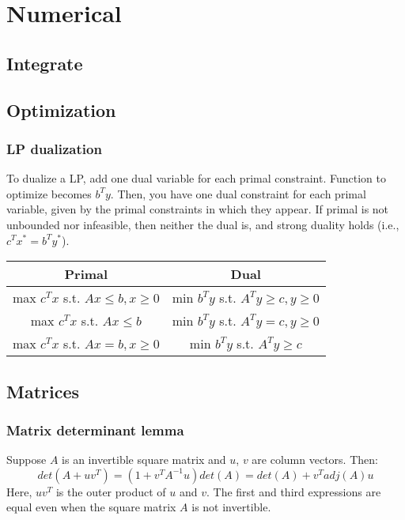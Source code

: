 \chapter{Numerical}

\section{Integrate}
  
\section{Optimization}
	
	\subsection{LP dualization}
	To dualize a LP, add one dual variable for each primal 
	constraint. Function to optimize becomes $b^T y$. 
	Then, you have one dual constraint for each primal variable, 
	given by the primal constraints in which they appear. 
	If primal is not unbounded nor infeasible, then neither the
	dual is, and strong duality holds (i.e., $c^T x^* = b^T y^*$).

		\begin{tabular}{ |c|c| } 
		 \hline
		 \textbf{Primal} & \textbf{Dual} \\
		 \hline
		 max $c^T x$ s.t. $Ax \leq b, x \geq 0$ & min $b^T y$ s.t. $A^T y \geq c, y \geq 0$ \\ 
		 max $c^T x$ s.t. $Ax \leq b$ & min $b^T y$ s.t. $A^T y = c, y \geq 0$ \\ 
		 max $c^T x$ s.t. $Ax = b, x \geq 0$ & min $b^T y$ s.t. $A^T y \geq c$ \\ 
		 \hline
		\end{tabular}


\section{Matrices}

	\subsection{Matrix determinant lemma}
		Suppose $A$ is an invertible square matrix and $u$, $v$ are column vectors. Then:
		$$det(A + u v^{T}) = (1 + v^{T} A^{-1} u) det(A) = det(A) + v^{T} adj(A) u$$
		Here, $u v^{T}$ is the outer product of $u$ and $v$. 
		The first and third expressions are equal even when the square matrix $A$ is not invertible.

